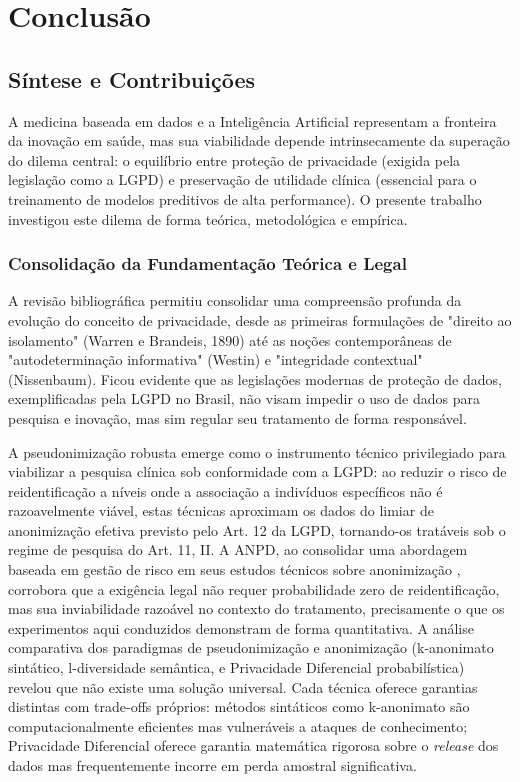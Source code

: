\chapter{Conclusão}
\label{ch:conclusao}

\section{Síntese e Contribuições}
\label{sec:conclusao-sintese}

A medicina baseada em dados e a Inteligência Artificial representam a fronteira da inovação em saúde, mas sua viabilidade depende intrinsecamente da superação do dilema central: o equilíbrio entre proteção de privacidade (exigida pela legislação como a LGPD) e preservação de utilidade clínica (essencial para o treinamento de modelos preditivos de alta performance). O presente trabalho investigou este dilema de forma teórica, metodológica e empírica.

\subsection{Consolidação da Fundamentação Teórica e Legal}

A revisão bibliográfica permitiu consolidar uma compreensão profunda da evolução do conceito de privacidade, desde as primeiras formulações de "direito ao isolamento" (Warren e Brandeis, 1890) até as noções contemporâneas de "autodeterminação informativa" (Westin) e "integridade contextual" (Nissenbaum). Ficou evidente que as legislações modernas de proteção de dados, exemplificadas pela LGPD no Brasil, não visam impedir o uso de dados para pesquisa e inovação, mas sim regular seu tratamento de forma responsável.

A pseudonimização robusta emerge como o instrumento técnico privilegiado para viabilizar a pesquisa clínica sob conformidade com a LGPD: ao reduzir o risco de reidentificação a níveis onde a associação a indivíduos específicos não é razoavelmente viável, estas técnicas aproximam os dados do limiar de anonimização efetiva previsto pelo Art. 12 da LGPD, tornando-os tratáveis sob o regime de pesquisa do Art. 11, II. A ANPD, ao consolidar uma abordagem baseada em gestão de risco em seus estudos técnicos sobre anonimização \cite{ANPD2023juridica, ANPD2023computacional}, corrobora que a exigência legal não requer probabilidade zero de reidentificação, mas sua inviabilidade razoável no contexto do tratamento, precisamente o que os experimentos aqui conduzidos demonstram de forma quantitativa. A análise comparativa dos paradigmas de pseudonimização e anonimização (k-anonimato sintático, l-diversidade semântica, e Privacidade Diferencial probabilística) revelou que não existe uma solução universal. Cada técnica oferece garantias distintas com trade-offs próprios: métodos sintáticos como k-anonimato são computacionalmente eficientes mas vulneráveis a ataques de conhecimento; Privacidade Diferencial oferece garantia matemática rigorosa sobre o \textit{release} dos dados mas frequentemente incorre em perda amostral significativa.

